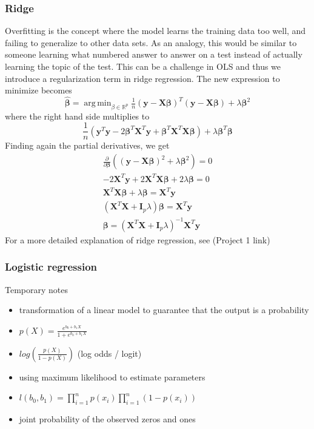 \documentclass{article}
\theoremstyle{definition}
\DeclareMathOperator*{\argmin}{arg\,min}
\begin{document}
\subsubsection{Ridge}
Overfitting is the concept where the model learns the training data too well, and failing to generalize to other data sets. As an analogy, this would be similar to someone learning what numbered answer to answer on a test instead of actually learning the topic of the test. This can be a challenge in OLS and thus we introduce a regularization term in ridge regression. The new expression to minimize becomes
\begin{equation*}
    \bm{\hat{\beta}} = \argmin_{\beta \in \mathbb{R}^p}\tfrac{1}{n}(\mathbf{y} - \mathbf{X}\bm{\beta})^T(\mathbf{y} - \mathbf{X}\bm{\beta}) + \lambda\bm{\beta}^2
\end{equation*}
where the right hand side multiplies to
\begin{equation*}
    \frac{1}{n}(\mathbf{y}^T\mathbf{y} - 2\bm{\beta}^T\mathbf{X}^T\mathbf{y} + \bm{\beta}^T\mathbf{X}^T\mathbf{X}\bm{\beta}) + \lambda\bm{\beta}^T\bm{\beta}
\end{equation*}
Finding again the partial derivatives, we get
\begin{gather*}
    \frac{\partial}{\partial \boldsymbol{\beta}} \left( \left( \boldsymbol{y} - \textbf{X} \boldsymbol{\beta} \right)^2 + \lambda \boldsymbol{\beta}^2 \right) = 0 \\
    -2 \textbf{X}^T \boldsymbol{y} + 2 \textbf{X}^T \boldsymbol{X \beta} + 2\lambda \boldsymbol{\beta} = 0 \\
    \textbf{X}^T \boldsymbol{X \beta} + \lambda \boldsymbol{\beta} = \textbf{X}^T \boldsymbol{y} \\
    \left(\textbf{X}^T \textbf{X} + \boldsymbol{I}_p \lambda \right) \boldsymbol{\beta} = \textbf{X}^T \boldsymbol{y} \\
    \boldsymbol{\beta} = \left(\textbf{X}^T \textbf{X} + \boldsymbol{I}_p \lambda \right)^{-1} \textbf{X}^T \boldsymbol{y}
\end{gather*}
For a more detailed explanation of ridge regression, see (Project 1 link)

\subsubsection{Logistic regression}
Temporary notes
\begin{itemize}
    \item transformation of a linear model to guarantee that the output is a probability
    \item $p(X) = \frac{e^{b_0 + b_1X}}{1 + e^{b_0 + b_1X}}$
    \item $log(\frac{p(X)}{1 - p(X)})$ (log odds / logit)
    \item using maximum likelihood to estimate parameters
    \item $l(b_0,b_1) = \prod_{i=1}^{n}p(x_i)\prod_{i=1}^{n}(1 - p(x_i))$
    \item joint probability of the observed zeros and ones
\end{itemize} 
\end{document}
